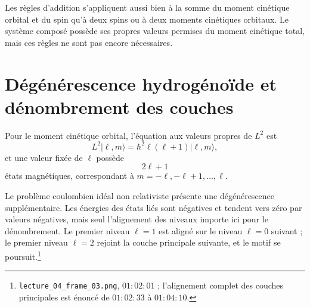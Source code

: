 Les règles d’addition s’appliquent aussi bien à la somme du moment cinétique orbital et du spin qu’à deux spins ou à deux moments cinétiques orbitaux. Le système composé possède ses propres valeurs permises du moment cinétique total, mais ces règles ne sont pas encore nécessaires.

\begin{classroomqa}
\end{classroomqa}

\section{Dégénérescence hydrogénoïde et dénombrement des couches}

Pour le moment cinétique orbital, l’équation aux valeurs propres de \(L^{2}\) est
\begin{equation}
L^{2}\lvert\ell,m\rangle
=\hbar^{2}\ell(\ell+1)\lvert\ell,m\rangle,
\end{equation}
et une valeur fixée de \(\ell\) possède
\begin{equation}
2\ell+1
\end{equation}
états magnétiques, correspondant à \(m=-\ell,-\ell+1,\ldots,\ell\).

Le problème coulombien idéal non relativiste présente une dégénérescence supplémentaire. Les énergies des états liés sont négatives et tendent vers zéro par valeurs négatives, mais seul l’alignement des niveaux importe ici pour le dénombrement. Le premier niveau \(\ell=1\) est aligné sur le niveau \(\ell=0\) suivant ; le premier niveau \(\ell=2\) rejoint la couche principale suivante, et le motif se poursuit.\footnote{\texttt{lecture\_04\_frame\_03.png}, \(01{:}02{:}01\) ; l’alignement complet des couches principales est énoncé de \(01{:}02{:}33\) à \(01{:}04{:}10\).}

